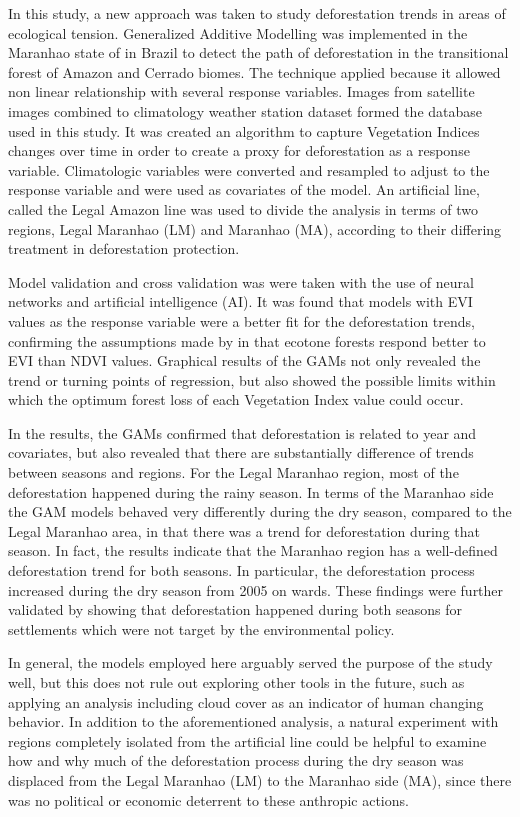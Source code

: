 In this study, a new approach was taken to study deforestation trends in areas of ecological tension. Generalized Additive Modelling was implemented in the Maranhao state of in Brazil to detect the path of deforestation in the transitional forest of Amazon and Cerrado biomes. The technique applied because it allowed non linear relationship with several response variables. Images from satellite images combined to climatology weather station dataset formed the database used in this study. It was created an algorithm to capture Vegetation Indices changes over time in order to create a proxy for deforestation as a response variable. Climatologic variables were converted and resampled to adjust to the response variable and were used as covariates of the model. An artificial line, called the Legal Amazon line was used to divide the analysis in terms of two regions, Legal Maranhao (LM) and Maranhao (MA), according to their differing treatment in deforestation protection.  

Model validation and cross validation was were taken with the use of neural networks and artificial intelligence (AI). It was found that models with EVI values as the response variable were a better fit for the deforestation trends, confirming the assumptions made by \citet{ratana_huete_ferreira_2005,bayma_sano_2015,didan_munoz_2015} in that ecotone forests respond better to EVI than NDVI values. Graphical results of the GAMs not only revealed the trend or turning points of regression, but also showed the possible limits within which the optimum forest loss of each Vegetation Index value could occur. 

In the results, the GAMs confirmed that deforestation is related to year and covariates, but also revealed that there are substantially difference of trends between seasons and regions. For the Legal Maranhao region, most of the deforestation happened during the rainy season. In terms of the Maranhao side the GAM models behaved very differently during the dry season, compared to the Legal Maranhao area, in that there was a trend for deforestation during that season. In fact, the results indicate that the Maranhao region has a well-defined deforestation trend for both seasons. In particular, the deforestation process increased during the dry season from 2005 on wards. These findings were further validated by showing that deforestation happened during both seasons for settlements which were not target by the environmental policy.

In general, the models employed here arguably served the purpose of the study well, but this does not rule out exploring other tools in the future, such as applying an analysis including cloud cover as an indicator of human changing behavior. In addition to the aforementioned analysis, a natural experiment with regions completely isolated from the artificial line could be helpful to examine how and why much of the deforestation process during the dry season was displaced from the Legal Maranhao (LM) to the Maranhao side (MA), since there was no political or economic deterrent to these anthropic actions. 

